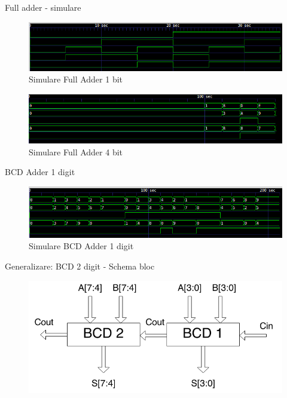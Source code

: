 \documentclass{beamer}
\begin{document}
\begin{frame}{Full adder - simulare}

\begin{figure}[H]
	\centering
	\includegraphics[scale=0.4]{fulladder1bit.png}
	\caption{Simulare Full Adder 1 bit}
\end{figure}

\begin{figure}[H]
	\centering
	\includegraphics[scale=0.4]{fa4bit.png}
	\caption{Simulare Full Adder 4 bit}
\end{figure}

\end{frame}

\begin{frame}{BCD Adder 1 digit}

\begin{figure}[H]
	\centering
	\includegraphics[scale=0.45]{bcd1digi.png}
	\caption{Simulare BCD Adder 1 digit}
\end{figure}

\end{frame}

\begin{frame}{Generalizare: BCD 2 digit - Schema bloc}

\begin{figure}[H]
	\centering
	\includegraphics[scale=0.45]{../img/2digitBCD.png}
\end{figure}

\end{frame}
\end{document}
